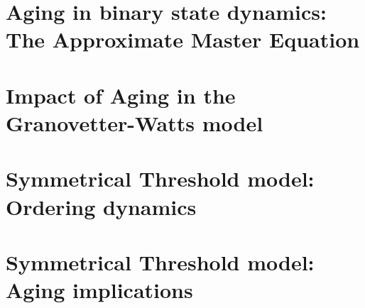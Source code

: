 \documentclass[
	11pt, %
	a4paper,
]{LegrandOrangeBook}
\begin{document}
\chapter{\label{ch:Aging in binary state dynamics} Aging in binary state dynamics: The Approximate Master Equation}


\chapterspaceabove{6.75cm}
\chapterspacebelow{7.25cm}

\chapter{\label{ch:Aging in the Granovetter-Watts model} Impact of Aging in the Granovetter-Watts model}


\renewcommand{\thechapter}{6A} %
\chapterspaceabove{6.75cm}
\chapterspacebelow{7.25cm}

\chapter{\label{ch:Ordering dynamics in the Symmetrical Threshold model} Symmetrical Threshold model: Ordering dynamics}


\renewcommand{\thechapter}{6B} %
\chapterspaceabove{6.75cm}
\chapterspacebelow{7.25cm}

\chapter{\label{ch:Aging implications in the Symmetrical Threshold model} Symmetrical Threshold model: Aging implications}

\end{document}
